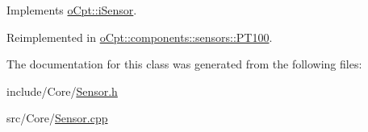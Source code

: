 Implements \hyperlink{classo_cpt_1_1i_sensor_aa55bc04979e4852989af2bd4f64e70bc}{o\+Cpt\+::i\+Sensor}.



Reimplemented in \hyperlink{classo_cpt_1_1components_1_1sensors_1_1_p_t100_a66619675288a5344a55242d9bf097aee}{o\+Cpt\+::components\+::sensors\+::\+P\+T100}.



The documentation for this class was generated from the following files\+:\begin{DoxyCompactItemize}
\item 
include/\+Core/\hyperlink{_sensor_8h}{Sensor.\+h}\item 
src/\+Core/\hyperlink{_sensor_8cpp}{Sensor.\+cpp}\end{DoxyCompactItemize}
